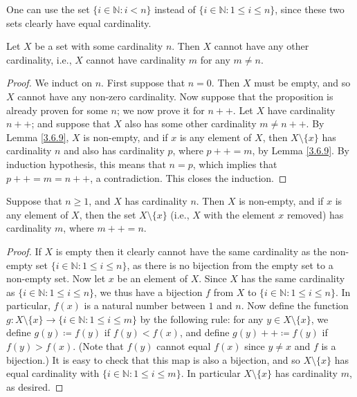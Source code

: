 \begin{remark}\label{3.6.6}
One can use the set \(\{i \in \mathds{N} : i < n\}\) instead of \(\{i \in \mathds{N} : 1 \leq i \leq n\}\), since these two sets clearly have equal cardinality.
\end{remark}

\setcounter{theorem}{7}
\begin{proposition}\label{3.6.8}
Let \(X\) be a set with some cardinality \(n\).
Then \(X\) cannot have any other cardinality, i.e., \(X\) cannot have cardinality \(m\) for any \(m \neq n\).
\end{proposition}

\begin{proof}
We induct on \(n\).
First suppose that \(n = 0\).
Then \(X\) must be empty, and so \(X\) cannot have any non-zero cardinality.
Now suppose that the proposition is already proven for some \(n\);
we now prove it for \(n++\).
Let \(X\) have cardinality \(n++\);
and suppose that \(X\) also has some other cardinality \(m \neq n++\).
By Lemma \ref{3.6.9}, \(X\) is non-empty, and if \(x\) is any element of \(X\), then \(X \setminus \{x\}\) has cardinality \(n\) and also has cardinality \(p\), where \(p++ = m\), by Lemma \ref{3.6.9}.
By induction hypothesis, this means that \(n = p\), which implies that \(p++ = m = n++\), a contradiction.
This closes the induction.
\end{proof}

\begin{lemma}\label{3.6.9}
Suppose that \(n \geq 1\), and \(X\) has cardinality \(n\).
Then \(X\) is non-empty, and if \(x\) is any element of \(X\), then the set \(X \setminus \{x\}\) (i.e., \(X\) with the element \(x\) removed) has cardinality \(m\), where \(m++ = n\).
\end{lemma}

\begin{proof}
If \(X\) is empty then it clearly cannot have the same cardinality as the non-empty set \(\{i \in \mathds{N} : 1 \leq i \leq n\}\), as there is no bijection from the empty set to a non-empty set.
Now let \(x\) be an element of \(X\).
Since \(X\) has the same cardinality as \(\{i \in \mathds{N} : 1 \leq i \leq n\}\), we thus have a bijection \(f\) from \(X\) to \(\{i \in \mathds{N} : 1 \leq i \leq n\}\).
In particular, \(f(x)\) is a natural number between \(1\) and \(n\).
Now define the function \(g : X \setminus \{x\} \to \{i \in \mathds{N} : 1 \leq i \leq m\}\) by the following rule: for any \(y \in X \setminus \{x\}\), we define \(g(y) \coloneqq f(y)\) if \(f(y) < f(x)\), and define \(g(y)++ \coloneqq f(y)\) if \(f(y) > f(x)\).
(Note that \(f(y)\) cannot equal \(f(x)\) since \(y \neq x\) and \(f\) is a bijection.)
It is easy to check that this map is also a bijection, and so \(X \setminus \{x\}\) has equal cardinality with \(\{i \in \mathds{N} : 1 \leq i \leq m\}\).
In particular \(X \setminus \{x\}\) has cardinality \(m\), as desired.
\end{proof}

